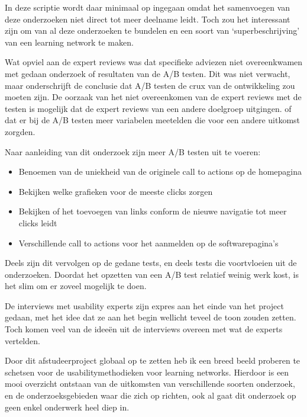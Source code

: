 \documentclass[a4paper, 10pt, pdftex]{report}
\begin{document}
  In deze scriptie wordt daar minimaal op ingegaan omdat het samenvoegen van deze onderzoeken niet direct tot meer deelname leidt. Toch zou het interessant zijn om van al deze onderzoeken te bundelen en een soort van `superbeschrijving' van een learning network te maken.

  Wat opviel aan de expert reviews was dat specifieke adviezen niet overeenkwamen met gedaan onderzoek of resultaten van de A/B testen. Dit was niet verwacht, maar onderschrijft de conclusie dat A/B testen de crux van de ontwikkeling zou moeten zijn. De oorzaak van het niet overeenkomen van de expert reviews met de testen is mogelijk dat de expert reviews van een andere doelgroep uitgingen. of dat er bij de A/B testen meer variabelen meetelden die voor een andere uitkomst zorgden.

  Naar aanleiding van dit onderzoek zijn meer A/B testen uit te voeren:
    \begin{itemize}
      \item Benoemen van de uniekheid van de originele call to actions op de homepagina
      \item Bekijken welke grafieken voor de meeste clicks zorgen
      \item Bekijken of het toevoegen van links conform de nieuwe navigatie tot meer clicks leidt
      \item Verschillende call to actions voor het aanmelden op de softwarepagina's
    \end{itemize}
  Deels zijn dit vervolgen op de gedane tests, en deels tests die voortvloeien uit de onderzoeken. Doordat het opzetten van een A/B test relatief weinig werk kost, is het slim om er zoveel mogelijk te doen.

  De interviews met usability experts zijn expres aan het einde van het project gedaan, met het idee dat ze aan het begin wellicht teveel de toon zouden zetten. Toch komen veel van de idee\"en uit de interviews overeen met wat de experts vertelden.

  Door dit afstudeerproject globaal op te zetten heb ik een breed beeld proberen te schetsen voor de usabilitymethodieken voor learning networks. Hierdoor is een mooi overzicht ontstaan van de uitkomsten van verschillende soorten onderzoek, en de onderzoeksgebieden waar die zich op richten, ook al gaat dit onderzoek op geen enkel onderwerk heel diep in.

  \listoftables

  \listoffigures

  \newpage
  
  
  \newpage

  \appendix
  \addappheadtotoc
  
  
  
  
  
  
  
\end{document}
